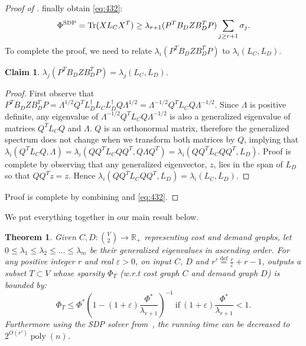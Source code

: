 \documentclass{article}
\def\triangleq{\overset{\mathrm{def}}{=}}
\let\eps=\varepsilon
\newtheorem{theorem}{Theorem}[section]
\newtheorem{claim}{Claim}[section]
\DeclareMathOperator{\poly}{poly}
\newcommand{\R}{\mathbb{R}}
\DeclareMathOperator{\tr}{Tr}
\newcounter{alg-count}
\newcommand{\vnote}[1]{}
\newcommand{\aknote}[1]{}
\begin{document}
\begin{proof}[Proof of ]
finally obtain \cref{eq:432}:
\begin{equation}
\label{eq:432}
\scsdp = \tr(X L_C X^T) \ge \lambda_{r+1}(P^T B_D Z B_D^T P) 
\sum_{j\ge r+1} \sigma_j.
\end{equation}
To complete the proof, we need to relate $\lambda_i(P^T B_D Z B_D^T
P)$ to $\lambda_i(L_C, L_D)$.
\begin{claim} \label{clm:50910112}
$\lambda_j(P^T B_D Z B_D^T P) = \lambda_j(L_C, L_D)$.
\end{claim}
\begin{proof} First observe that $P^T B_D Z B_D^T P = \Lambda^{1/2}
  Q^T L_D^{\dagger} L_C L_D^{\dagger} Q \Lambda^{1/2} = \Lambda^{-1/2}
  Q^T L_C Q \Lambda^{-1/2}$. Since $\Lambda$ is positive definite, any
  eigenvalue of $\Lambda^{-1/2} Q^T L_C Q \Lambda^{-1/2}$ is also a
  generalized eigenvalue of matrices $Q^T L_C Q$ and $\Lambda$. $Q$ is
  an orthonormal matrix, therefore the generalized spectrum does not
  change when we transform both matrices by $Q$, implying that
  $\lambda_i(Q^T L_C Q, \Lambda) = \lambda_i(Q Q^T L_C Q Q^T, Q
  \Lambda Q^T) = \lambda_i(Q Q^T L_C Q Q^T, L_D)$. Proof is complete
  by observing that any generalized eigenvector, $z$, lies in the span
  of $L_D$ so that $Q Q^T z = z$. Hence $\lambda_i(Q Q^T L_C Q Q^T,
  L_D) = \lambda_i(L_C, L_D)$.
\end{proof}
Proof is complete by combining  and \cref{eq:432}.
\end{proof}
We put everything together in our main result below.
\begin{theorem}
\label{cor:final-bnd}
Given $C, D: \binom{V}{2}\to \R_+$ representing cost and demand
graphs, let $ 0\le \lambda_1\le \lambda_2 \le \ldots \le \lambda_m $
be their generalized eigenvalues in ascending order.
For any positive integer $r$ and real $\eps>0$, on input $C$, $D$ and
$r' \triangleq \frac{r}{\eps}+r-1$,  outputs a
subset $T\subset V$ whose sparsity $\Phi_T$ (w.r.t cost graph $C$ and
demand graph $D$) is bounded by:
\[
\Phi_T \le \Phi^\ast \left( 1 - (1+\eps)
  \frac{\Phi^\ast}{\lambda_{r+1}}\right)^{-1} \ \text{if}\
(1+\eps) \frac{\Phi^\ast}{\lambda_{r+1}} < 1.
\]
Furthermore using the SDP solver from~\cite{gs12-fast}, the running
time can be decreased to $2^{O(r')} \poly(n)$.  \vnote{Where does the
  ``provided" constraint come from? It is not transparent from the
  proof.}  \aknote{Necessary otherwise the quantity is negative, which
  means the upper bound becomes lower bound when we take the
  reciprocal.}
\end{theorem}
\end{document}
